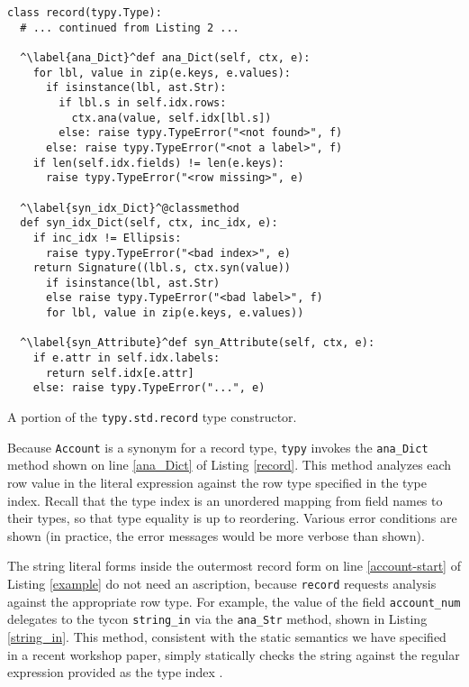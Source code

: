 \documentclass{sigplanconf}
\newcommand{\lip}[1]{\lstinline[language=Python,basicstyle=\ttfamily\small,deletendkeywords={tuple,buffer,map}]{#1}}
\begin{document}
\begin{codelisting}[t]
\begin{lstlisting}
class record(typy.Type): 
  # ... continued from Listing 2 ...

  ^\label{ana_Dict}^def ana_Dict(self, ctx, e):
    for lbl, value in zip(e.keys, e.values):
      if isinstance(lbl, ast.Str):
        if lbl.s in self.idx.rows: 
          ctx.ana(value, self.idx[lbl.s])
        else: raise typy.TypeError("<not found>", f)
      else: raise typy.TypeError("<not a label>", f)
    if len(self.idx.fields) != len(e.keys): 
      raise typy.TypeError("<row missing>", e)

  ^\label{syn_idx_Dict}^@classmethod
  def syn_idx_Dict(self, ctx, inc_idx, e):
    if inc_idx != Ellipsis: 
      raise typy.TypeError("<bad index>", e)
    return Signature((lbl.s, ctx.syn(value))
      if isinstance(lbl, ast.Str)
      else raise typy.TypeError("<bad label>", f)
      for lbl, value in zip(e.keys, e.values))

  ^\label{syn_Attribute}^def syn_Attribute(self, ctx, e):
    if e.attr in self.idx.labels: 
      return self.idx[e.attr]
    else: raise typy.TypeError("...", e)
\end{lstlisting}
%
\caption{A portion of the \texttt{typy.std.record} type constructor.}
\label{record}
\end{codelisting}

Because \lip{Account} is a synonym for a record type, \verb|typy| invokes the \lip{ana_Dict} method shown on line \ref{ana_Dict} of Listing \ref{record}. This method analyzes each row value in the literal expression against the row type specified in the type index. Recall that the type index is an unordered mapping from field names to their types, so that type equality is up to reordering. Various error conditions are shown (in practice, the error messages would be more verbose than shown).

The string literal forms inside the outermost record form on line \ref{account-start} of Listing \ref{example} do not need an ascription, because \lip{record} requests analysis against the appropriate row type. For example, the value of the field \lip{account_num} delegates to the tycon \lip{string_in} via the \lip{ana_Str} method, shown in Listing \ref{string_in}. This method, consistent with the static semantics we have specified in a recent workshop paper, simply statically checks the string against the regular expression provided as the type index \cite{sanitation-psp14}.
\end{document}

